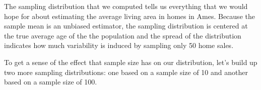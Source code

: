 \documentclass[11pt]{article}
\begin{document}
The sampling distribution that we computed tells us everything that we would hope for about estimating the average living area in homes in Ames.  Because the sample mean is an unbiased estimator, the sampling distribution is centered at the true average age of the the population and the spread of the distribution indicates how much variability is induced by sampling only 50 home sales.

To get a sense of the effect that sample size has on our distribution, let's build up two more sampling distributions: one based on a sample size of 10 and another based on a sample size of 100.

\ttfamily\noindent
\hlstd{}\hspace*{\fill}\\
\hlstd{}\hlassignement{\usebox{\hlnormalsizeboxlessthan}-}{\ }\hlkeyword{(}\hlkeyword{,}{\ }\hlkeyword{)}\hspace*{\fill}\\
\hlstd{}\hlassignement{\usebox{\hlnormalsizeboxlessthan}-}{\ }\hlkeyword{(}\hlkeyword{,}{\ }\hlkeyword{)}\hspace*{\fill}\\

\hlstd{}\hlkeyword{(}\hlkeyword{:}\hlkeyword{)}\hlkeyword{\usebox{\hlnormalsizeboxopenbrace}}\hspace*{\fill}\\
\hlstd{}{\ }{\ }\hlassignement{\usebox{\hlnormalsizeboxlessthan}-}{\ }\hlkeyword{(}\hlkeyword{,}{\ }\hlkeyword{)}\hspace*{\fill}\\
\hlstd{}{\ }{\ }\hlkeyword{[}\hlkeyword{]}{\ }\hlassignement{\usebox{\hlnormalsizeboxlessthan}-}{\ }\hlkeyword{(}\hlkeyword{)}\hspace*{\fill}\\
\hlstd{}{\ }{\ }\hlassignement{\usebox{\hlnormalsizeboxlessthan}-}{\ }\hlkeyword{(}\hlkeyword{,}{\ }\hlkeyword{)}\hspace*{\fill}\\
\hlstd{}{\ }{\ }\hlkeyword{[}\hlkeyword{]}{\ }\hlassignement{\usebox{\hlnormalsizeboxlessthan}-}{\ }\hlkeyword{(}\hlkeyword{)}\hspace*{\fill}\\
\hlstd{}\hlkeyword{\usebox{\hlnormalsizeboxclosebrace}}\hspace*{\fill}\\
\hlstd{}\hspace*{\fill}\\
\normalfont
\end{document}
